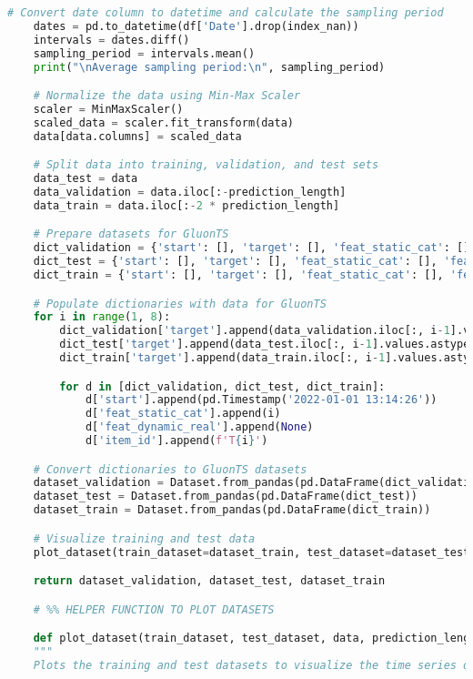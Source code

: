 \begin{lstlisting}[language=Python, caption={Code for loading and preprocessing the time series data}, breaklines=true, label=code2]
    # Convert date column to datetime and calculate the sampling period
    dates = pd.to_datetime(df['Date'].drop(index_nan))
    intervals = dates.diff()
    sampling_period = intervals.mean()
    print("\nAverage sampling period:\n", sampling_period)

    # Normalize the data using Min-Max Scaler
    scaler = MinMaxScaler()
    scaled_data = scaler.fit_transform(data)
    data[data.columns] = scaled_data

    # Split data into training, validation, and test sets
    data_test = data
    data_validation = data.iloc[:-prediction_length]
    data_train = data.iloc[:-2 * prediction_length]

    # Prepare datasets for GluonTS
    dict_validation = {'start': [], 'target': [], 'feat_static_cat': [], 'feat_dynamic_real': [], 'item_id': []}
    dict_test = {'start': [], 'target': [], 'feat_static_cat': [], 'feat_dynamic_real': [], 'item_id': []}
    dict_train = {'start': [], 'target': [], 'feat_static_cat': [], 'feat_dynamic_real': [], 'item_id': []}

    # Populate dictionaries with data for GluonTS
    for i in range(1, 8):
        dict_validation['target'].append(data_validation.iloc[:, i-1].values.astype('float32'))
        dict_test['target'].append(data_test.iloc[:, i-1].values.astype('float32'))
        dict_train['target'].append(data_train.iloc[:, i-1].values.astype('float32'))

        for d in [dict_validation, dict_test, dict_train]:
            d['start'].append(pd.Timestamp('2022-01-01 13:14:26'))
            d['feat_static_cat'].append(i)
            d['feat_dynamic_real'].append(None)
            d['item_id'].append(f'T{i}')

    # Convert dictionaries to GluonTS datasets
    dataset_validation = Dataset.from_pandas(pd.DataFrame(dict_validation))
    dataset_test = Dataset.from_pandas(pd.DataFrame(dict_test))
    dataset_train = Dataset.from_pandas(pd.DataFrame(dict_train))

    # Visualize training and test data
    plot_dataset(train_dataset=dataset_train, test_dataset=dataset_test, data=data, prediction_length=prediction_length)

    return dataset_validation, dataset_test, dataset_train

    # %% HELPER FUNCTION TO PLOT DATASETS

    def plot_dataset(train_dataset, test_dataset, data, prediction_length):
    """
    Plots the training and test datasets to visualize the time series data used for forecasting.


\end{lstlisting}
